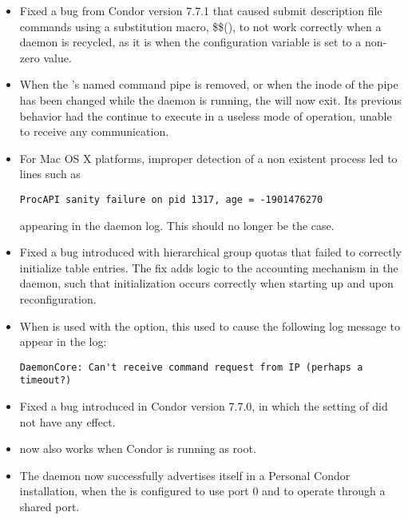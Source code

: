 \begin{itemize}

\item Fixed a bug from Condor version 7.7.1
that caused submit description file commands using a substitution macro,
\$\$(),
to not work correctly when a  daemon is recycled,
as it is when the configuration variable 
is set to a non-zero value.

\item When the 's named command pipe is removed, 
or when the inode of the pipe has been changed while the daemon is running, 
the  will now exit.
Its previous behavior had the  continue to execute 
in a useless mode of operation, unable to receive any communication.

\item For Mac OS X platforms, 
improper detection of a non existent process led to lines such as
\begin{verbatim}
ProcAPI sanity failure on pid 1317, age = -1901476270
\end{verbatim}
appearing in the  daemon log.
This should no longer be the case.

\item Fixed a bug introduced with hierarchical group quotas that
failed to correctly initialize table entries.
The fix adds logic to the accounting mechanism in the
 daemon,
such that initialization occurs correctly 
when starting up and upon reconfiguration.

\item When  is used with the  option, this
used to cause the following log message to appear in the 
log:
\begin{verbatim}
DaemonCore: Can't receive command request from IP (perhaps a timeout?)
\end{verbatim}

\item Fixed a bug introduced in Condor version 7.7.0,
in which the setting of  did not have any effect.

\item {} now also works when Condor is running as root.

\item The  daemon now successfully advertises itself in 
a Personal Condor installation,
when the  is configured to use port 0
and to operate through a shared port.


\end{itemize}
